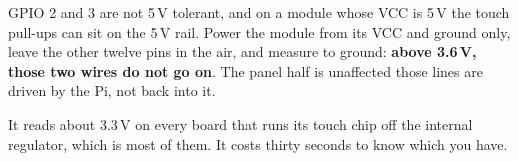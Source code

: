 \documentclass[11pt]{article}
\begin{document}
\vspace{3mm}
\begin{dangerbox}
GPIO 2 and 3 are not 5\,V tolerant, and on a module whose VCC is 5\,V the touch
pull-ups can sit on the 5\,V rail. Power the module from its VCC and ground
only, leave the other twelve pins in the air, and measure  to
ground: \textbf{above 3.6\,V, those two wires do not go on}. The panel half is
unaffected \textemdash{} those lines are driven by the Pi, not back into it.

\vspace{1ex}
It reads about 3.3\,V on every board that runs its touch chip off the internal
regulator, which is most of them. It costs thirty seconds to know which you have.
\end{dangerbox}
\end{document}
